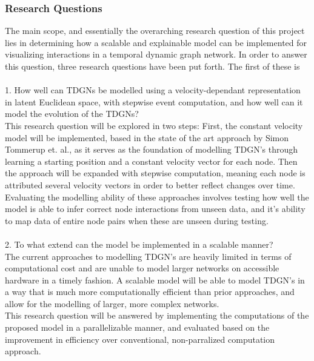 \subsubsection{Research Questions} 
\label{sec:Intro:ResearchQs}
The main scope, and essentially the overarching research question of this project lies in determining how a scalable and explainable model can be implemented for visualizing interactions in a temporal dynamic graph network.
In order to answer this question, three research questions have been put forth.
The first of these is
\\\\
\hspace*{5mm} 1. How well can TDGNs be modelled using a velocity-dependant representation in latent Euclidean space, with stepwise event computation, and how well can it model the evolution of the TDGNs?
\\
This research question will be explored in two steps:
First, the constant velocity model will be implemented, based in the state of the art approach by Simon Tommerup et. al., as it serves as the foundation of modelling TDGN's through learning a starting position and a constant velocity vector for each node.
Then the approach will be expanded with stepwise computation, meaning each node is attributed several velocity vectors in order to better reflect changes over time.
\\
Evaluating the modelling ability of these approaches involves testing how well the model is able to infer correct node interactions from unseen data, and it's ability to map data of entire node pairs when these are unseen during testing.
\\\\
\hspace*{5mm} 2. To what extend can the model be implemented in a scalable manner?
\\
The current approaches to modelling TDGN's are heavily limited in terms of computational cost and are unable to model larger networks on accessible hardware in a timely fashion.
A scalable model will be able to model TDGN's in a way that is much more computationally efficient than prior approaches, and allow for the modelling of larger, more complex networks.
\\
This research question will be answered by implementing the computations of the proposed model in a parallelizable manner, and evaluated based on the improvement in efficiency over conventional, non-parralized computation approach.
\\\\
